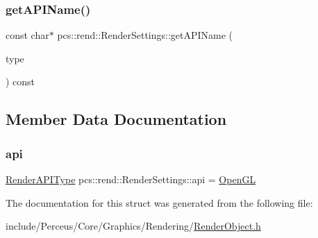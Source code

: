 \subsubsection{\texorpdfstring{get\+A\+P\+I\+Name()}{getAPIName()}}
{\footnotesize\ttfamily const char$\ast$ pcs\+::rend\+::\+Render\+Settings\+::get\+A\+P\+I\+Name (\begin{DoxyParamCaption}\item[{\hyperlink{namespacepcs_1_1rend_a9627be55d9b373e41fd62c11e118e68f}{Render\+A\+P\+I\+Type}}]{type }\end{DoxyParamCaption}) const\hspace{0.3cm}{\ttfamily [inline]}}



\subsection{Member Data Documentation}
\mbox{\label{structpcs_1_1rend_1_1RenderSettings_a62f0625f562fa1c6a4f7be8c783931f5}} 
\subsubsection{\texorpdfstring{api}{api}}
{\footnotesize\ttfamily \hyperlink{namespacepcs_1_1rend_a9627be55d9b373e41fd62c11e118e68f}{Render\+A\+P\+I\+Type} pcs\+::rend\+::\+Render\+Settings\+::api = \hyperlink{namespacepcs_1_1rend_a9627be55d9b373e41fd62c11e118e68fab356921baf7069b879f7bab06b3ae51e}{Open\+GL}}



The documentation for this struct was generated from the following file\+:\begin{DoxyCompactItemize}
\item 
include/\+Perceus/\+Core/\+Graphics/\+Rendering/\hyperlink{RenderObject_8h}{Render\+Object.\+h}\end{DoxyCompactItemize}

